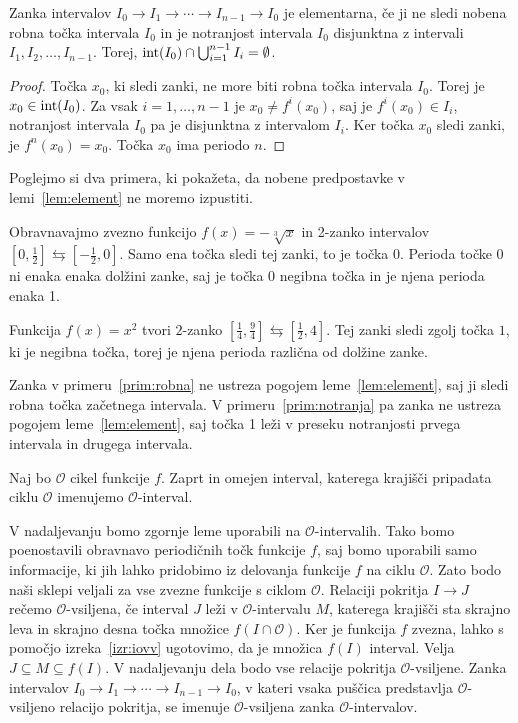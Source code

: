 \documentclass[../TG_magistrsko_delo_sections.tex]{subfiles}
\begin{document}
\begin{lema}\label{lem:element}
Zanka intervalov $I_0 \to I_1 \to \cdots \to I_{n-1} \to I_0$ je elementarna, če ji ne sledi nobena robna točka intervala $I_0$ in je notranjost intervala $I_0$ disjunktna z intervali $I_1, I_2,  \dots, I_{n-1}$. Torej, $\operatorname{int}(I_0) \cap \bigcup_{i=1}^{n-1}I_i = \emptyset$.
\end{lema}
\begin{proof}
Točka $x_0$, ki sledi zanki, ne more biti robna točka intervala $I_0$. Torej je $x_0 \in \operatorname{int}(I_0)$. Za vsak $i=1, \dots, n-1$ je $x_0 \neq f^i(x_0)$, saj je $f^i(x_0) \in I_i$, notranjost intervala $I_0$ pa je disjunktna z intervalom $I_i$. Ker točka $x_0$ sledi zanki, je $f^n(x_0)=x_0$. Točka $x_0$ ima periodo $n$.
\end{proof}

Poglejmo si dva primera, ki pokažeta, da nobene predpostavke v lemi~\ref{lem:element} ne moremo izpustiti.

\begin{primer}\label{prim:robna}
Obravnavajmo zvezno funkcijo $f(x) = -\sqrt[3]{x}$ in 2-zanko intervalov $\left[0, \frac{1}{2}\right] \leftrightarrows \left[-\frac{1}{2}, 0\right]$. Samo ena točka sledi tej zanki, to je točka 0. Perioda točke 0 ni enaka enaka dolžini zanke, saj je točka 0 negibna točka in je njena perioda enaka 1.
\end{primer}
\begin{primer}\label{prim:notranja}
Funkcija $f(x) = x^2$ tvori $2$-zanko $\left[\frac{1}{4}, \frac{9}{4}\right] \leftrightarrows \left[\frac{1}{2}, 4\right]$. Tej zanki sledi zgolj točka $1$, ki je negibna točka, torej je njena perioda različna od dolžine zanke.
\end{primer}
Zanka v primeru~\ref{prim:robna} ne ustreza pogojem leme~\ref{lem:element}, saj ji sledi robna točka začetnega intervala. V primeru~\ref{prim:notranja} pa zanka ne ustreza pogojem leme~\ref{lem:element}, saj točka 1 leži v preseku notranjosti prvega intervala in drugega intervala. 

\begin{definicija}
Naj bo $\mathcal{O}$ cikel funkcije $f$. Zaprt in omejen interval, katerega krajišči pripadata ciklu $\mathcal{O}$ imenujemo $\mathcal{O}$-interval. 
\end{definicija}
V nadaljevanju bomo zgornje leme uporabili na $\mathcal{O}$-intervalih. Tako bomo poenostavili obravnavo periodičnih točk funkcije $f$, saj bomo uporabili samo informacije, ki jih lahko pridobimo iz delovanja funkcije $f$ na ciklu $\mathcal{O}$. Zato bodo naši sklepi veljali za vse zvezne funkcije s ciklom $\mathcal{O}$. Relaciji pokritja $I \to J$ rečemo $\mathcal{O}$-vsiljena, če interval $J$ leži v $\mathcal{O}$-intervalu $M$, katerega krajišči sta skrajno leva in skrajno desna točka množice $f(I \cap \mathcal{O})$. Ker je funkcija $f$ zvezna, lahko s pomočjo izreka~\ref{izr:iovv} ugotovimo, da je množica $f(I)$ interval. Velja $J \subseteq M \subseteq f(I)$. V nadaljevanju dela bodo vse relacije pokritja $\mathcal{O}$-vsiljene. Zanka intervalov $I_0 \to I_1 \to \cdots \to I_{n-1} \to I_0$, v kateri vsaka puščica predstavlja $\mathcal{O}$-vsiljeno relacijo pokritja, se imenuje $\mathcal{O}$-vsiljena zanka $\mathcal{O}$-intervalov.
\end{document}
